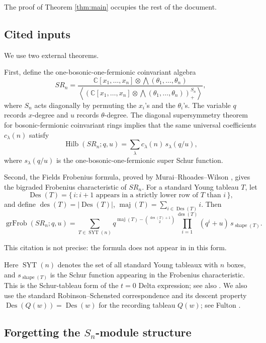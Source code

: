 \documentclass[12pt]{article}
\DeclareMathOperator{\Hilb}{Hilb}
\DeclareMathOperator{\grFrob}{grFrob}
\DeclareMathOperator{\Des}{Des}
\DeclareMathOperator{\des}{des}
\DeclareMathOperator{\maj}{maj}
\DeclareMathOperator{\shape}{shape}
\newcommand{\SYT}{\operatorname{SYT}}
\newcommand{\review}[1]{\begin{reviewbox}#1\end{reviewbox}}
\begin{document}
The proof of Theorem \ref{thm:main} occupies the rest of the document.

\subsection{Cited inputs}

We use two external theorems.

First, define the one-bosonic-one-fermionic coinvariant algebra
\[
SR_n
=
\frac{\mathbb C[x_1,\ldots,x_n]\otimes \bigwedge(\theta_1,\ldots,\theta_n)}
{\left\langle
\left(\mathbb C[x_1,\ldots,x_n]\otimes \bigwedge(\theta_1,\ldots,\theta_n)\right)^{S_n}_{+}
\right\rangle},
\]
where \(S_n\) acts diagonally by permuting the \(x_i\)'s and the \(\theta_i\)'s.  The variable \(q\) records \(x\)-degree and \(u\) records \(\theta\)-degree.  The diagonal supersymmetry theorem for bosonic-fermionic coinvariant rings \cite{Lentfer2025} implies that the same universal coefficients \(c_\lambda(n)\) satisfy
\begin{equation}\label{eq:diagonal-supersymmetry}
\Hilb(SR_n;q,u)
=
\sum_\lambda c_\lambda(n)\,s_\lambda(q/u),
\end{equation}
where \(s_\lambda(q/u)\) is the one-bosonic-one-fermionic super Schur function.

Second, the Fields Frobenius formula, proved by Murai--Rhoades--Wilson \cite{MRW2025}, gives the bigraded Frobenius characteristic of \(SR_n\).  For a standard Young tableau \(T\), let
\[
\Des(T)=\{\,i: i+1 \text{ appears in a strictly lower row of }T\text{ than }i\,\},
\]
and define \(\des(T)=|\Des(T)|\), \(\maj(T)=\sum_{i\in\Des(T)}i\).  Then
\begin{equation}\label{eq:fields}
\grFrob(SR_n;q,u)
=
\sum_{T\in \SYT(n)}
q^{\maj(T)-\binom{\des(T)+1}{2}}
\prod_{i=1}^{\des(T)}(q^i+u)\,
s_{\shape(T)}.
\end{equation}
\review{This citation is not precise: the formula does not appear in \cite{MRW2025} in this form.}

Here \(\SYT(n)\) denotes the set of all standard Young tableaux with \(n\) boxes, and \(s_{\shape(T)}\) is the Schur function appearing in the Frobenius characteristic.  This is the Schur-tableau form of the \(t=0\) Delta expression; see also \cite{HRS2019}.  We also use the standard Robinson--Schensted correspondence and its descent property \(\Des(Q(w))=\Des(w)\) for the recording tableau \(Q(w)\); see Fulton \cite{Fulton1997}.

\subsection{Forgetting the \(S_n\)-module structure}
\end{document}
